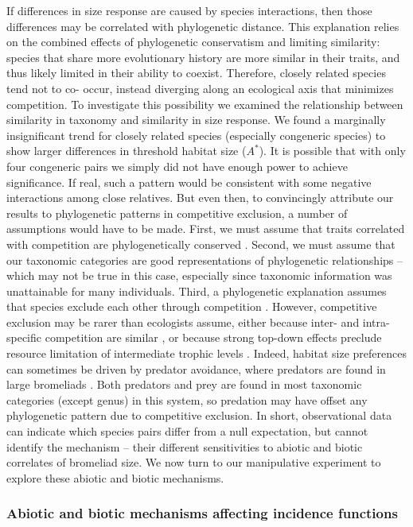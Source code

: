 If differences in size response are caused by species interactions, then
those differences may be correlated with phylogenetic distance. This
explanation relies on the combined effects of phylogenetic conservatism
and limiting similarity: species that share more evolutionary history
are more similar in their traits, and thus likely limited in their
ability to coexist. Therefore, closely related species tend not to co-
occur, instead diverging along an ecological axis that minimizes
competition. To investigate this possibility we examined the
relationship between similarity in taxonomy and similarity in size
response. We found a marginally insignificant trend for closely related
species (especially congeneric species) to show larger differences in
threshold habitat size (\(A^{*}\)). It is possible that with only four
congeneric pairs we simply did not have enough power to achieve
significance. If real, such a pattern would be consistent with some
negative interactions among close relatives. But even then, to
convincingly attribute our results to phylogenetic patterns in
competitive exclusion, a number of assumptions would have to be made.
First, we must assume that traits correlated with competition are
phylogenetically conserved \citep{Swenson2011}. Second, we must assume
that our taxonomic categories are good representations of phylogenetic
relationships -- which may not be true in this case, especially since
taxonomic information was unattainable for many individuals. Third, a
phylogenetic explanation assumes that species exclude each other through
competition \citep{Narwani2015}. However, competitive exclusion may be
rarer than ecologists assume, either because inter- and intra-specific
competition are similar \citep{Hubbell1997}, or because strong top-down
effects preclude resource limitation of intermediate trophic levels
\citep{Holt2004}. Indeed, habitat size preferences can sometimes be
driven by predator avoidance, where predators are found in large
bromeliads \citep{Hammill2015}. Both predators and prey are found in
most taxonomic categories (except genus) in this system, so predation
may have offset any phylogenetic pattern due to competitive exclusion.
In short, observational data can indicate which species pairs differ
from a null expectation, but cannot identify the mechanism -- their
different sensitivities to abiotic and biotic correlates of bromeliad
size. We now turn to our manipulative experiment to explore these
abiotic and biotic mechanisms.

\subsubsection{Abiotic and biotic mechanisms affecting incidence
functions}\label{abiotic-and-biotic-mechanisms-affecting-incidence-functions}

